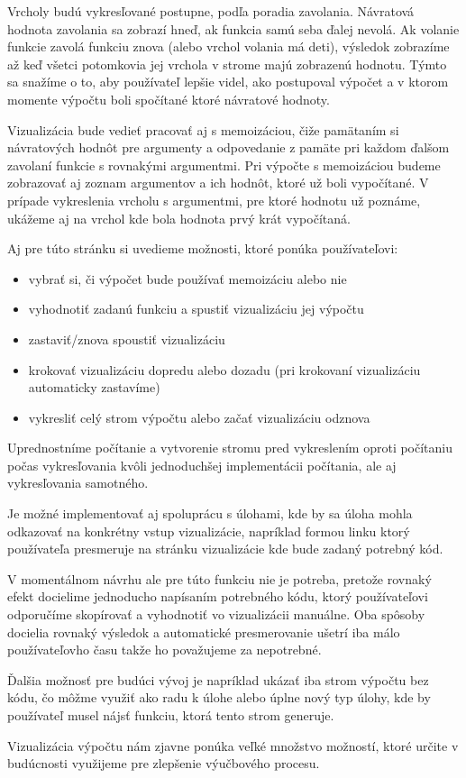 Vrcholy budú vykresľované postupne, podľa poradia zavolania. Návratová hodnota zavolania
sa zobrazí hneď, ak funkcia samú seba ďalej nevolá. Ak volanie funkcie zavolá funkciu znova (alebo vrchol volania má deti),
výsledok zobrazíme až keď všetci potomkovia jej vrchola v strome
majú zobrazenú hodnotu. Týmto sa snažíme o to, aby používateľ lepšie videl, ako postupoval výpočet a v ktorom momente výpočtu
boli spočítané ktoré návratové hodnoty.

Vizualizácia bude vedieť pracovať aj s memoizáciou, čiže pamätaním si návratových hodnôt pre
argumenty a odpovedanie z pamäte pri každom ďalšom zavolaní funkcie s rovnakými argumentmi.
Pri výpočte s memoizáciou budeme zobrazovať aj zoznam argumentov a ich hodnôt, ktoré už boli vypočítané.
V prípade vykreslenia vrcholu s argumentmi, pre ktoré hodnotu už poznáme, ukážeme aj na vrchol
kde bola hodnota prvý krát vypočítaná.

Aj pre túto stránku si uvedieme možnosti, ktoré ponúka používateľovi:
\begin{itemize}
  \item vybrať si, či výpočet bude používať memoizáciu alebo nie
  \item vyhodnotiť zadanú funkciu a spustiť vizualizáciu jej výpočtu
  \item zastaviť/znova spoustiť vizualizáciu
  \item krokovať vizualizáciu dopredu alebo dozadu (pri krokovaní vizualizáciu
   automaticky zastavíme)
  \item vykresliť celý strom výpočtu alebo začať vizualizáciu odznova
\end{itemize}

Uprednostníme počítanie a vytvorenie stromu pred vykreslením oproti počítaniu počas vykresľovania
kvôli jednoduchšej implementácii počítania, ale aj vykresľovania samotného.

Je možné implementovať aj spoluprácu s úlohami, kde by sa úloha mohla odkazovať
na konkrétny vstup vizualizácie, napríklad formou linku ktorý používateľa presmeruje
na stránku vizualizácie kde bude zadaný potrebný kód.

V momentálnom návrhu ale pre túto funkciu nie je potreba, pretože rovnaký efekt docielime
jednoducho napísaním potrebného kódu, ktorý používateľovi odporučíme skopírovať
a vyhodnotiť vo vizualizácii manuálne. Oba spôsoby docielia rovnaký výsledok a
automatické presmerovanie ušetrí iba málo používateľovho času takže ho považujeme
za nepotrebné.

Ďalšia možnosť pre budúci vývoj je napríklad ukázať iba strom výpočtu bez kódu, čo môžme
využiť ako radu k úlohe alebo úplne nový typ úlohy, kde by používateľ musel
nájsť funkciu, ktorá tento strom generuje.

Vizualizácia výpočtu nám zjavne ponúka veľké množstvo možností, ktoré určite v budúcnosti využijeme
pre zlepšenie výučbového procesu.
